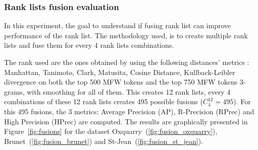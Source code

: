 \subsubsection{Rank lists fusion evaluation}

In this experiment, the goal to understand if fusing rank list can improve performance of the rank list.
The methodology used, is to create multiple rank lists and fuse them for every 4 rank lists combinations.

The rank used are the ones obtained by using the following distances' metrics : Manhattan, Tanimoto, Clark, Matusita, Cosine Distance, Kullback-Leibler divergence on both the top 500 MFW tokens and the top 750 MFW tokens 3-grams, with smoothing for all of them.
This creates 12 rank lists, every 4 combinations of these 12 rank lists creates 495 possible fusions ($C^{12}_{4} = 495$).
For this 495 fusions, the 3 metrics: Average Precision (AP), R-Precision (RPrec) and High Precision (HPrec) are computed.
The results are graphically presented in Figure~\ref{fig:fusions} for the dataset Oxquarry~(\ref{fig:fusion_oxquarry}), Brunet~(\ref{fig:fusion_brunet}) and St-Jean~(\ref{fig:fusion_st_jean}).

